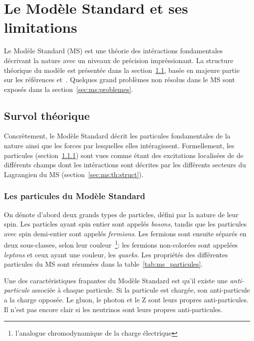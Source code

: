 \section{Le Modèle Standard et ses limitations}
\label{sec:ms}

Le Modèle Standard (MS) est une théorie des intéractions fondamentales
décrivant la nature avec un niveaux de précision impréssionant.
La structure théorique du modèle est présentée dans la
section~\ref{sec:ms:th}, basée en majeure partie sur les références
\cite{olive_review_2014} et~\cite{thomson_modern_2013}. Quelques grand
problèmes non résolus dans le MS sont exposés dans la
section~\ref{sec:ms:problemes}.

\subsection{Survol théorique}
\label{sec:ms:th}

Concrètement, le Modèle Standard décrit les particules fondamentales
de la nature ainsi que les forces par lesquelles elles
intéragissent. Formellement, les particules
(section~\ref{sec:ms:th:particules}) sont vues comme étant des
excitations localisées de de différents champs dont les intéractions
sont décrites par les différents secteurs du Lagrangien du MS
(section~\ref{sec:ms:th:struct}).

\subsubsection{Les particules du Modèle Standard}
\label{sec:ms:th:particules}

On dénote d'abord deux grands types de particles, défini par la nature
de leur spin. Les particles ayant spin entier sont appelés
\emph{bosons}, tandis que les particules avec spin demi-entier sont
appelés \emph{fermions}. Les fermions sont ensuite séparés en deux
sous-classes, selon leur couleur~\footnote{l'analogue chromodynamique
  de la charge électrique}: les fermions non-colorées sont appelées
\emph{leptons} et ceux ayant une couleur, les \emph{quarks}. Les
propriétés des différentes particules du MS sont résumées dans la
table~\ref{tab:ms_particules}.

Une des caractéristiques frapantes du Modèle Standard est qu'il existe
une \emph{anti-particule} associée à chaque particule. Si la particule
est chargée, son anti-particule a la charge opposée. Le gluon, le
photon et le Z sont leurs propres anti-particules. Il n'est pas encore
clair si les neutrinos sont leurs propres anti-particules.


